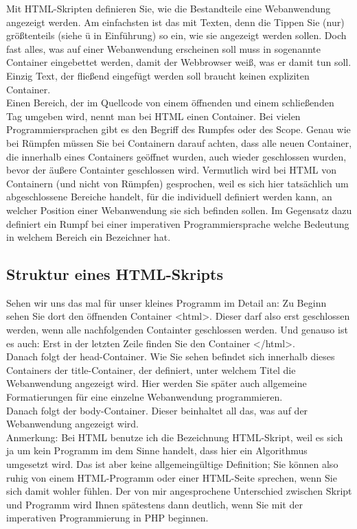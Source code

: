 Mit HTML-Skripten definieren Sie, wie die Bestandteile eine Webanwendung angezeigt werden. Am einfachsten ist das mit Texten, denn die Tippen Sie (nur) größtenteils (siehe ü in Einführung) so ein, wie sie angezeigt werden sollen. Doch fast alles, was auf einer Webanwendung erscheinen soll muss in sogenannte Container eingebettet werden, damit der Webbrowser weiß, was er damit tun soll. Einzig Text, der fließend eingefügt werden soll braucht keinen expliziten Container.\\

Einen Bereich, der im Quellcode von einem öffnenden und einem schließenden Tag umgeben wird, nennt man bei HTML einen Container. Bei vielen Programmiersprachen gibt es den Begriff des Rumpfes oder des Scope. Genau wie bei Rümpfen müssen Sie bei Containern darauf achten, dass alle neuen Container, die innerhalb eines Containers geöffnet wurden, auch wieder geschlossen wurden, bevor der äußere Containter geschlossen wird. Vermutlich wird bei HTML von Containern (und nicht von Rümpfen) gesprochen, weil es sich hier tatsächlich um abgeschlossene Bereiche handelt, für die individuell definiert werden kann, an welcher Position einer Webanwendung sie sich befinden sollen. Im Gegensatz dazu definiert ein Rumpf bei einer imperativen Programmiersprache welche Bedeutung in welchem Bereich ein Bezeichner hat.

\subsection{Struktur eines HTML-Skripts}

Sehen wir uns das mal für unser kleines Programm im Detail an: Zu Beginn sehen Sie dort den öffnenden Container <html>. Dieser darf also erst geschlossen werden, wenn alle nachfolgenden Containter geschlossen werden. Und genauso ist es auch: Erst in der letzten Zeile finden Sie den Container </html>.\\

Danach folgt der head-Container. Wie Sie sehen befindet sich innerhalb dieses Containers der title-Container, der definiert, unter welchem Titel die Webanwendung angezeigt wird. Hier werden Sie später auch allgemeine Formatierungen für eine einzelne Webanwendung programmieren.\\

Danach folgt der body-Container. Dieser beinhaltet all das, was auf der Webanwendung angezeigt wird.\\

Anmerkung: Bei HTML benutze ich die Bezeichnung HTML-Skript, weil es sich ja um kein Programm im dem Sinne handelt, dass hier ein Algorithmus umgesetzt wird. Das ist aber keine allgemeingültige Definition; Sie können also ruhig von einem HTML-Programm oder einer HTML-Seite sprechen, wenn Sie sich damit wohler fühlen. Der von mir angesprochene Unterschied zwischen Skript und Programm wird Ihnen spätestens dann deutlich, wenn Sie mit der imperativen Programmierung in PHP beginnen.\\

